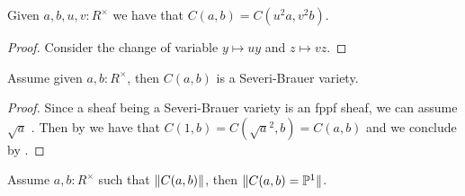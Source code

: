 \begin{lemma}\label{conic-change-variable}
Given $a,b,u,v:R^\times$ we have that $C(a,b) = C(u^2a,v^2b)$.
\end{lemma}

\begin{proof}
Consider the change of variable $y\mapsto uy$ and $z\mapsto vz$.
\end{proof}

\begin{lemma}
Assume given $a,b:R^\times$, then $C(a,b)$ is a Severi-Brauer variety.
\end{lemma}

\begin{proof}
Since a sheaf being a Severi-Brauer variety is an fppf sheaf, we can assume $\sqrt{a}$ . Then by  we have that $C(1,b) = C(\sqrt{a}^2,b)=C(a,b)$ and we conclude by .
\end{proof}


\begin{lemma}\label{pointed-conics-projective}
Assume $a,b:R^\times$ such that $\lVert C(a,b) \rVert$, then $\lVert C(a,b)=\mathbb{P}^1 \rVert$.
\end{lemma}


